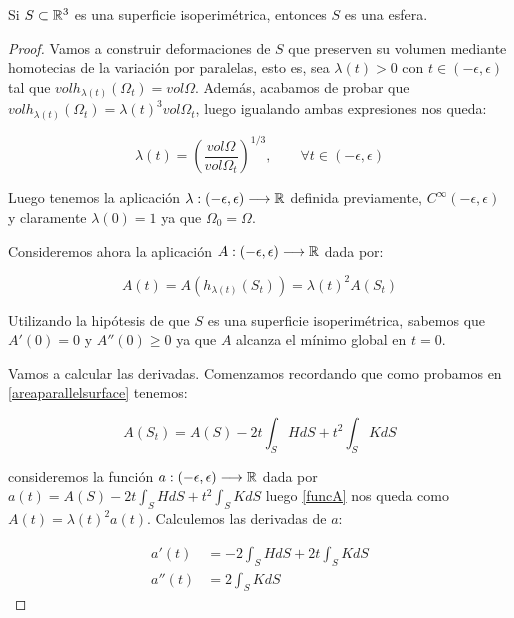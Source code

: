 \begin{theorem}
Si $S \subset \mathbb{R}^3$ es una superficie isoperimétrica, entonces $S$ es una esfera.
\end{theorem}
\begin{proof}
Vamos a construir deformaciones de $S$ que preserven su volumen mediante homotecias de la variación por paralelas, esto es, sea $\lambda(t) > 0$ con $t \in (-\epsilon, \epsilon)$ tal que $vol h_{\lambda(t)}(\Omega_t) = vol \Omega$. Además, acabamos de probar que $vol h_{\lambda(t)}(\Omega_t) = \lambda(t)^3 vol \Omega_t$, luego igualando ambas expresiones nos queda:

\begin{equation*}\label{lambdafunction}
    \lambda(t) = \left( \frac{vol \Omega}{vol \Omega_t} \right) ^{1/3}, \qquad \forall t \in (-\epsilon, \epsilon)
\end{equation*}

Luego tenemos la aplicación $\lambda: (-\epsilon, \epsilon) \longrightarrow \mathbb{R}$ definida previamente, $C^\infty(-\epsilon, \epsilon)$ y claramente $\lambda(0) = 1$ ya que $\Omega_0 = \Omega$. 

Consideremos ahora la aplicación $A: (-\epsilon, \epsilon) \longrightarrow \mathbb{R}$ dada por:

\begin{equation}\label{funcA}
    A(t) = A(h_{\lambda(t)} (S_t)) = \lambda(t)^2 A(S_t)
\end{equation}

Utilizando la hipótesis de que $S$ es una superficie isoperimétrica, sabemos que $A'(0) = 0$ y $A''(0) \geq 0$ ya que $A$ alcanza el mínimo global en $t=0$.

Vamos a calcular las derivadas. Comenzamos recordando que como probamos en \ref{areaparallelsurface} tenemos:

\begin{equation*}
    A(S_t) = A(S) -2t\int_{S} HdS + t^2\int_{S} KdS
\end{equation*}

consideremos la función $a: (-\epsilon, \epsilon) \longrightarrow \mathbb{R}$ dada por $a(t) = A(S) -2t\int_{S} HdS + t^2\int_{S} KdS$ luego \autoref{funcA} nos queda como $A(t) = \lambda(t)^2 a(t)$. Calculemos las derivadas de $a$:

\begin{align*}
    a'(t) &= -2\int_{S} HdS + 2t\int_{S} KdS \\
    a''(t) &= 2\int_{S} KdS
\end{align*}


\end{proof}
